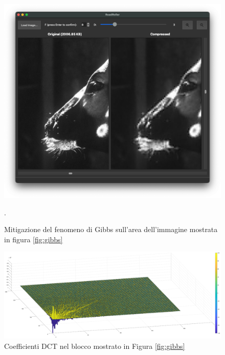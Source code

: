 \begin{figure}[h]
	\centering
	\includegraphics[width=1\linewidth]{figures/gibbs_small}
	\caption{Mitigazione del fenomeno di Gibbs sull'area dell'immagine mostrata in figura \ref{fig:gibbs}}.
	\label{fig:gibbs_small}
\end{figure}


\begin{figure}
	\centering
	\includegraphics[width=1\linewidth]{figures/dct_values_3d.eps}
	\caption{Coefficienti DCT nel blocco mostrato in Figura \ref{fig:gibbs}}
	\label{fig:dct_values_on_gibbs}
\end{figure}

